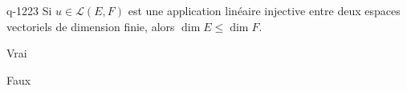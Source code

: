 \begin{truefalse}{q-1223}
Si $u\in \mathcal{L}(E,F)$ est une application linéaire injective entre deux espaces vectoriels de dimension finie, alors $\dim E \leq\dim F$.
\item* Vrai
\item Faux
\end{truefalse}

